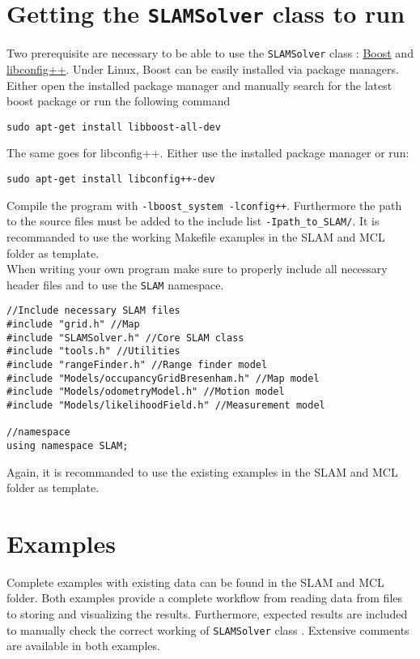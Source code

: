 \documentclass{article}
\newcommand{\SLAM}{\texttt{SLAMSolver} class }
\begin{document}
\section{Getting the \SLAM to run}
Two prerequisite are necessary to be able to use the \SLAM: \href{http://www.boost.org/}{Boost} and \href{http://www.hyperrealm.com/libconfig/}{libconfig++}. Under Linux, Boost can be easily installed via package managers. Either open the installed package manager and manually search for the latest boost package or run the following command
\begin{lstlisting}
sudo apt-get install libboost-all-dev
\end{lstlisting}
The same goes for libconfig++. Either use the installed package manager or run:
\begin{lstlisting}
sudo apt-get install libconfig++-dev
\end{lstlisting}
Compile the program with \texttt{-lboost\_system -lconfig++}. Furthermore the path to the source files must be added to the include list \texttt{-Ipath\_to\_SLAM/}. It is recommanded to use the working Makefile examples in the SLAM and MCL folder as template.\\
When writing your own program make sure to properly include all necessary header files and to use the \texttt{SLAM} namespace.
\begin{lstlisting}
//Include necessary SLAM files
#include "grid.h" //Map
#include "SLAMSolver.h" //Core SLAM class
#include "tools.h" //Utilities
#include "rangeFinder.h" //Range finder model
#include "Models/occupancyGridBresenham.h" //Map model
#include "Models/odometryModel.h" //Motion model
#include "Models/likelihoodField.h" //Measurement model

//namespace
using namespace SLAM;
\end{lstlisting}
Again, it is recommanded to use the existing examples in the SLAM and MCL folder as template.
\section{Examples}
Complete examples with existing data can be found in the SLAM and MCL folder. Both examples provide a complete workflow from reading data from files to storing and visualizing the results. Furthermore, expected results are included to manually check the correct working of \SLAM. Extensive comments are available in both examples.
\end{document}
